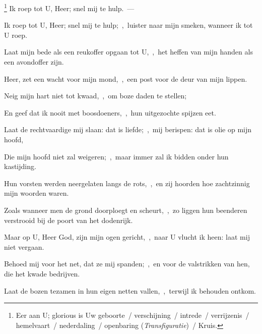 \documentclass[12pt,twoside,a5paper]{article}
\begin{document}
\begin{halfparskip}
  \footnote{ Eer aan U; glorious is Uw geboorte~/ verschijning~/ intrede~/ verrijzenis~/ hemelvaart~/ nederdaling~/ openbaring (\emph{Transfiguratie})~/ Kruis.} Ik roep tot U, Heer; snel mij te hulp.~--- 

  Ik roep tot U, Heer; snel mij te hulp;~\sep\ luister naar mijn smeken, wanneer ik tot U roep.

  Laat mijn bede als een reukoffer opgaan tot U,~\sep\ het heffen van mijn handen als een avondoffer zijn.

  Heer, zet een wacht voor mijn mond,~\sep\ een post voor de deur van mijn lippen.

  Neig mijn hart niet tot kwaad,~\sep\ om boze daden te stellen;

  En geef dat ik nooit met boosdoeners,~\sep\ hun uitgezochte spijzen eet.

  Laat de rechtvaardige mij slaan: dat is liefde;~\sep\ mij berispen: dat is olie op mijn hoofd,

  Die mijn hoofd niet zal weigeren;~\sep\ maar immer zal ik bidden onder hun kastijding.

  Hun vorsten werden neergelaten langs de rots,~\sep\ en zij hoorden hoe zachtzinnig mijn woorden waren.

  Zoals wanneer men de grond doorploegt en scheurt,~\sep\ zo liggen hun beenderen verstrooid bij de poort van het dodenrijk.

  Maar op U, Heer God, zijn mijn ogen gericht,~\sep\ naar U vlucht ik heen: laat mij niet vergaan.

  Behoed mij voor het net, dat ze mij spanden;~\sep\ en voor de valstrikken van hen, die het kwade bedrijven.

  Laat de bozen tezamen in hun eigen netten vallen,~\sep\ terwijl ik behouden ontkom.
\end{halfparskip}
\end{document}
